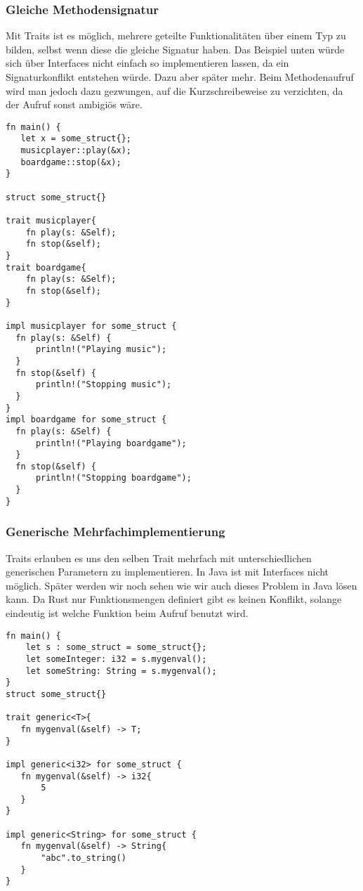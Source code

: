\documentclass[a4paper, 1ppt]{article}
\begin{document}
\subsubsection{Gleiche Methodensignatur}
Mit Traits ist es möglich, mehrere geteilte Funktionalitäten über einem Typ zu bilden, selbst wenn diese die gleiche Signatur haben.
Das Beispiel unten würde sich über Interfaces nicht einfach so implementieren lassen, da ein Signaturkonflikt entstehen würde. Dazu aber später mehr.
Beim Methodenaufruf wird man jedoch dazu gezwungen, auf die Kurzschreibeweise zu verzichten, da der Aufruf sonst ambigiös wäre.
\begin{verbatim}
fn main() {
   let x = some_struct{};
   musicplayer::play(&x);
   boardgame::stop(&x);
}

struct some_struct{}

trait musicplayer{
    fn play(s: &Self);
    fn stop(&self);
}
trait boardgame{
    fn play(s: &Self);
    fn stop(&self);
}

impl musicplayer for some_struct {
  fn play(s: &Self) {
      println!("Playing music");
  }
  fn stop(&self) {
      println!("Stopping music");
  }
}
impl boardgame for some_struct {
  fn play(s: &Self) {
      println!("Playing boardgame");
  }
  fn stop(&self) {
      println!("Stopping boardgame");
  }
}
\end{verbatim}
\subsubsection{Generische Mehrfachimplementierung}
Traits erlauben es uns den selben Trait mehrfach mit unterschiedlichen generischen Parametern zu implementieren.
In Java ist mit Interfaces nicht möglich. Später werden wir noch sehen wie wir auch dieses Problem in Java lösen kann.
Da Rust nur Funktionsmengen definiert gibt es keinen Konflikt, solange eindeutig ist welche Funktion beim Aufruf benutzt wird.
\begin{verbatim}
fn main() {
    let s : some_struct = some_struct{};
    let someInteger: i32 = s.mygenval();
    let someString: String = s.mygenval();
}
struct some_struct{}

trait generic<T>{
   fn mygenval(&self) -> T;
}

impl generic<i32> for some_struct {
   fn mygenval(&self) -> i32{
       5
   }
}

impl generic<String> for some_struct {
   fn mygenval(&self) -> String{
       "abc".to_string()
   }
}
\end{verbatim}
\end{document}
